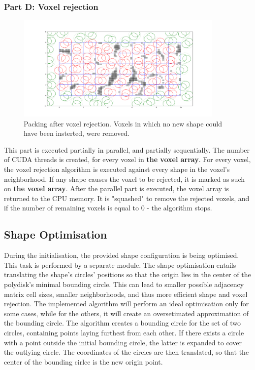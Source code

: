 \documentclass[12pt, oneside]{report}
\begin{document}
\subsubsection{Part D: Voxel rejection}

\begin{figure}[H]
  \centering
	\includegraphics[width=0.9\textwidth,keepaspectratio]{Images/GPURSA/Figure_6.pdf}
	\caption{Packing after voxel rejection. Voxels in which no new shape could have been insterted, were removed.}
	\label{GPURSA_Process_5}
\end{figure}

This part is executed partially in parallel, and partially sequentially. \newline
The number of CUDA threads is created, for every voxel in \textbf{the voxel array}. For every voxel, the voxel rejection algorithm is executed against every shape in the voxel's neighborhood. If any shape causes the voxel to be rejected, it is marked as such on \textbf{the voxel array}. \newline
After the parallel part is executed, the voxel array is returned to the CPU memory. It is "squashed" to remove the rejected voxels, and if the number of remaining voxels is equal to 0 - the algorithm stops.

\subsection{Shape Optimisation}

During the initialisation, the provided shape configuration is being optimised. This task is performed by a separate module. The shape optimisation entails translating the shape's circles' positions so that the origin lies in the center of the polydisk's minimal bounding circle. This can lead to smaller possible adjacency matrix cell sizes, smaller neighborhoods, and thus more efficient shape and voxel rejection. \newline
The implemented algorithm will perform an ideal optimisation only for some cases, while for the others, it will create an oversetimated approximation of the bounding circle. The algorithm creates a bounding circle for the set of two circles, containing points laying furthest from each other. If there exists a circle with a point outside the initial bounding circle, the latter is expanded to cover the outlying circle. The coordinates of the circles are then translated, so that the center of the bounding cirlce is the new origin point.
\end{document}

